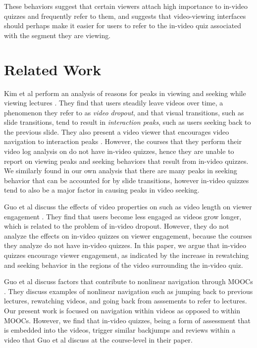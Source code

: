 \documentclass[letterpaper]{article}
\begin{document}
These behaviors suggest that certain viewers attach high importance to in-video quizzes and frequently refer to them, and suggests that video-viewing interfaces should perhaps make it easier for users to refer to the in-video quiz associated with the segment they are viewing.

\newpage

\section{Related Work}

Kim et al perform an analysis of reasons for peaks in viewing and seeking while viewing lectures \cite{juho}. They find that users steadily leave videos over time, a phenomenon they refer to as \emph{video dropout}, and that visual transitions, such as slide transitions, tend to result in \emph{interaction peaks}, such as users seeking back to the previous slide. They also present a video viewer that encourages video navigation to interaction peaks  \cite{juho2}. However, the courses that they perform their video log analysis on do not have in-video quizzes, hence they are unable to report on viewing peaks and seeking behaviors that result from in-video quizzes. We similarly found in our own analysis that there are many peaks in seeking behavior that can be accounted for by slide transitions, however in-video quizzes tend to also be a major factor in causing peaks in video seeking.

Guo et al discuss the effects of video properties on such as video length on viewer engagement \cite{guovideo}. They find that users become less engaged as videos grow longer, which is related to the problem of in-video dropout. However, they do not analyze the effects on in-video quizzes on viewer engagement, because the courses they analyze do not have in-video quizzes. In this paper, we argue that in-video quizzes encourage viewer engagement, as indicated by the increase in rewatching and seeking behavior in the regions of the video surrounding the in-video quiz.

Guo et al discuss factors that contribute to nonlinear navigation through MOOCs \cite{guodemographics}. They discuss examples of nonlinear navigation such as jumping back to previous lectures, rewatching videos, and going back from asssements to refer to lectures. Our present work is focused on navigation within videos as opposed to within MOOCs. However, we find that in-video quizzes, being a form of assessment that is embedded into the videos, trigger similar backjumps and reviews within a video that Guo et al discuss at the course-level in their paper.
\end{document}
